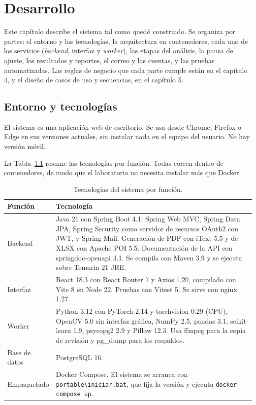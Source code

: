 \chapter{Desarrollo}

Este capítulo describe el sistema tal como quedó construido. Se organiza por partes: el entorno y
las tecnologías, la arquitectura en contenedores, cada uno de los servicios (\textit{backend},
interfaz y \textit{worker}), las etapas del análisis, la pausa de ajuste, los resultados y reportes,
el correo y las cuentas, y las pruebas automatizadas. Las reglas de negocio que cada parte cumple
están en el capítulo 4, y el diseño de casos de uso y secuencias, en el capítulo 5.

\section{Entorno y tecnologías}

El sistema es una aplicación web de escritorio. Se usa desde Chrome, Firefox o Edge en sus versiones
actuales, sin instalar nada en el equipo del usuario. No hay versión móvil.

La Tabla~\ref{tab:tecnologias} resume las tecnologías por función. Todas corren dentro de
contenedores, de modo que el laboratorio no necesita instalar más que Docker.

\begin{table}[H]
\centering
\caption{Tecnologías del sistema por función.}
\label{tab:tecnologias}
\begin{tabular}{|p{3.4cm}|p{10.8cm}|}
\hline
\textbf{Función} & \textbf{Tecnología} \\
\hline
Backend & Java 21 con Spring Boot 4.1: Spring Web MVC, Spring Data JPA, Spring Security como servidor de recursos OAuth2 con JWT, y Spring Mail. Generación de PDF con iText 5.5 y de XLSX con Apache POI 5.5. Documentación de la API con springdoc-openapi 3.1. Se compila con Maven 3.9 y se ejecuta sobre Temurin 21 JRE. \\
\hline
Interfaz & React 18.3 con React Router 7 y Axios 1.20, compilado con Vite 8 en Node 22. Pruebas con Vitest 5. Se sirve con nginx 1.27. \\
\hline
Worker & Python 3.12 con PyTorch 2.14 y torchvision 0.29 (CPU), OpenCV 5.0 sin interfaz gráfica, NumPy 2.5, pandas 3.1, scikit-learn 1.9, psycopg2 2.9 y Pillow 12.3. Usa ffmpeg para la copia de revisión y pg\_dump para los respaldos. \\
\hline
Base de datos & PostgreSQL 16. \\
\hline
Empaquetado & Docker Compose. El sistema se arranca con \texttt{portable\textbackslash iniciar.bat}, que fija la versión y ejecuta \texttt{docker compose up}. \\
\hline
\end{tabular}
\end{table}

